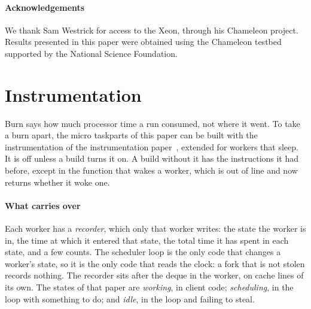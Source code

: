 \documentclass[sigplan,nonacm]{acmart}
\begin{document}
\paragraph{Acknowledgements}
%
We thank Sam Westrick for access to the Xeon, through his Chameleon
project.
%
Results presented in this paper were obtained using the Chameleon
testbed~\cite{keahey2020lessons} supported by the National Science
Foundation.




\appendix

\section{Instrumentation}
\label{sec:instr}

Burn says how much processor time a run consumed, not where it went.
%
To take a burn apart, the micro taskparts of this paper can be built
with the instrumentation of the instrumentation
paper~\cite{instrumentation}, extended for workers that sleep.
%
It is off unless a build turns it on.
%
A build without it has the instructions it had before, except in the
function that wakes a worker, which is out of line and now returns
whether it woke one.

\paragraph{What carries over}
%
Each worker has a \emph{recorder}, which only that worker writes: the
state the worker is in, the time at which it entered that state, the
total time it has spent in each state, and a few counts.
%
The scheduler loop is the only code that changes a worker's state, so
it is the only code that reads the clock: a fork that is not stolen
records nothing.
%
The recorder sits after the deque in the worker, on cache lines of
its own.
%
The states of that paper are \emph{working}, in client code;
\emph{scheduling}, in the loop with something to do; and \emph{idle},
in the loop and failing to steal.
\end{document}
